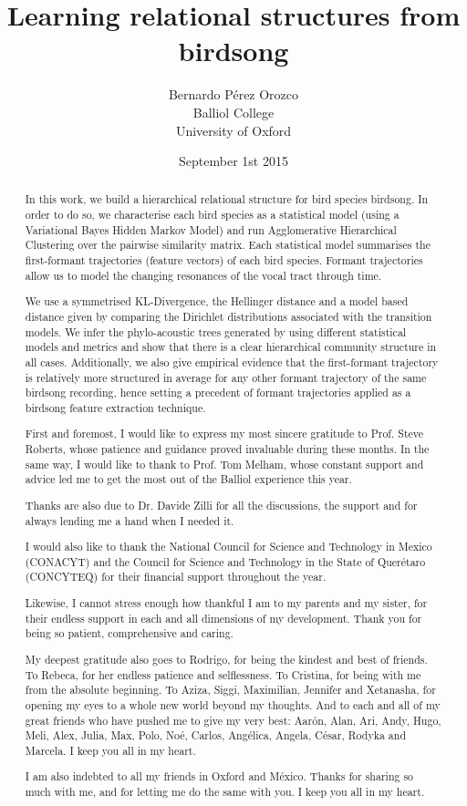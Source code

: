 \documentclass[pdftex,12pt,a4paper]{report}
\title{Learning relational structures from birdsong}
\author{Bernardo Pérez Orozco\\Balliol College\\University of Oxford}
\date{ September 1st 2015 }
\theoremstyle{definition}
\theoremstyle{remark}
\begin{document}
 

\begin{abstract}
In this work, we build a hierarchical relational structure for bird species birdsong. In order to do so, we characterise each bird species as a statistical model (using a Variational Bayes Hidden Markov Model) and run Agglomerative Hierarchical Clustering over the pairwise similarity matrix. Each statistical model summarises the first-formant trajectories (feature vectors) of each bird species. Formant trajectories allow us to model the changing resonances of the vocal tract through time.
\par We use a symmetrised KL-Divergence, the Hellinger distance and a model based distance given by comparing the Dirichlet distributions associated with the transition models. We infer the phylo-acoustic trees generated by using different statistical models and metrics and show that there is a clear hierarchical community structure in all cases. Additionally, we also give empirical evidence that the first-formant trajectory is relatively more structured in average for any other formant trajectory of the same birdsong recording, hence setting a precedent of formant trajectories applied as a birdsong feature extraction technique.
\end{abstract}

\renewcommand{\abstractname}{Acknowledgements}
\begin{abstract}
First and foremost, I would like to express my most sincere gratitude to Prof. Steve Roberts, whose patience and guidance proved invaluable during these months. In the same way, I would like to thank to Prof. Tom Melham, whose constant support and advice led me to get the most out of the Balliol experience this year.
\par Thanks are also due to Dr. Davide Zilli for all the discussions, the support and for always lending me a hand when I needed it. 
\par I would also like to thank the National Council for Science and Technology in Mexico (CONACYT) and the Council for Science and Technology in the State of Querétaro (CONCYTEQ) for their financial support throughout the year.
\par Likewise, I cannot stress enough how thankful I am to my parents and my sister, for their endless support in each and all dimensions of my development. Thank you for being so patient, comprehensive and caring. 
\par My deepest gratitude also goes to Rodrigo, for being the kindest and best of friends. To Rebeca, for her endless patience and selflessness. To Cristina, for being with me from the absolute beginning. To Aziza, Siggi, Maximilian, Jennifer and Xetanasha, for opening my eyes to a whole new world beyond my thoughts. And to each and all of my great friends who have pushed me to give my very best: Aarón, Alan, Ari, Andy, Hugo, Meli, Alex, Julia, Max, Polo, Noé, Carlos, Angélica, Angela, César, Rodyka and Marcela. I keep you all in my heart.

I am also indebted to all my friends in Oxford and México. Thanks for sharing so much with me, and for letting me do the same with you. I keep you all in my heart.
\end{abstract}
\end{document}
